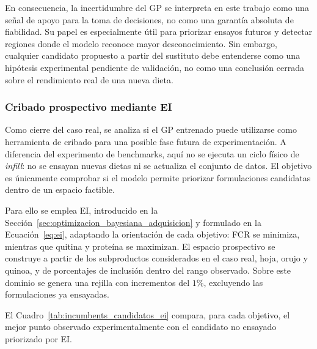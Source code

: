 En consecuencia, la incertidumbre del GP se interpreta en este trabajo como una señal de apoyo para la toma de decisiones, no como una garantía absoluta de fiabilidad. Su papel es especialmente útil para priorizar ensayos futuros y detectar regiones donde el modelo reconoce mayor desconocimiento. Sin embargo, cualquier candidato propuesto a partir del sustituto debe entenderse como una hipótesis experimental pendiente de validación, no como una conclusión cerrada sobre el rendimiento real de una nueva dieta.

\subsubsection{Cribado prospectivo mediante EI}
\label{subsubsec:preinfill_caso_real}

Como cierre del caso real, se analiza si el GP entrenado puede utilizarse como herramienta de cribado para una posible fase futura de experimentación. A diferencia del experimento de benchmarks, aquí no se ejecuta un ciclo físico de \emph{infill}: no se ensayan nuevas dietas ni se actualiza el conjunto de datos. El objetivo es únicamente comprobar si el modelo permite priorizar formulaciones candidatas dentro de un espacio factible.

Para ello se emplea EI, introducido en la Sección~\ref{sec:optimizacion_bayesiana_adquisicion} y formulado en la Ecuación~\eqref{eq:ei}, adaptando la orientación de cada objetivo: FCR se minimiza, mientras que quitina y proteína se maximizan. El espacio prospectivo se construye a partir de los subproductos considerados en el caso real, hoja, orujo y quinoa, y de porcentajes de inclusión dentro del rango observado. Sobre este dominio se genera una rejilla con incrementos del \(1\%\), excluyendo las formulaciones ya ensayadas.

El Cuadro~\ref{tab:incumbents_candidatos_ei} compara, para cada objetivo, el mejor punto observado experimentalmente con el candidato no ensayado priorizado por EI.

